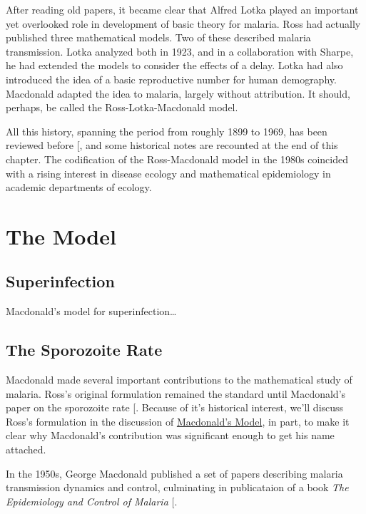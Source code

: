 \documentclass[
]{book}
\begin{document}
After reading old papers, it became clear that Alfred Lotka played an important yet overlooked role in development of basic theory for malaria.
Ross had actually published three mathematical models.
Two of these described malaria transmission.
Lotka analyzed both in 1923, and in a collaboration with Sharpe, he had extended the models to consider the effects of a delay.
Lotka had also introduced the idea of a basic reproductive number for human demography.
Macdonald adapted the idea to malaria, largely without attribution.
It should, perhaps, be called the Ross-Lotka-Macdonald model.

All this history, spanning the period from roughly 1899 to 1969, has been reviewed before {[}\citeproc{ref-SmithDL2012_RossMacdonald}{2}{]}, and some historical notes are recounted at the end of this chapter.
The codification of the Ross-Macdonald model in the 1980s coincided with a rising interest in disease ecology and mathematical epidemiology in academic departments of ecology.

\section{The Model}\label{the-model}

\subsection{Superinfection}\label{superinfection}

Macdonald's model for superinfection\ldots{}

\subsection{The Sporozoite Rate}\label{the-sporozoite-rate}

Macdonald made several important contributions to the mathematical study of malaria. Ross's original formulation remained the standard until Macdonald's paper on the sporozoite rate {[}\citeproc{ref-MacdonaldG1952Sporozoite}{38}{]}. Because of it's historical interest, we'll discuss Ross's formulation in the discussion of \hyperref[macdonalds-model]{Macdonald's Model}, in part, to make it clear why Macdonald's contribution was significant enough to get his name attached.

In the 1950s, George Macdonald published a set of papers describing malaria transmission dynamics and control, culminating in publicataion of a book \emph{The Epidemiology and Control of Malaria} {[}\citeproc{ref-MacdonaldG1957Book}{62}{]}.
\end{document}
